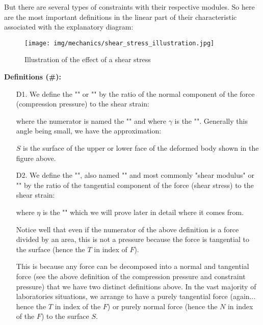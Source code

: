 	But there are several types of constraints with their respective modules. So here are the most important definitions in the linear part of their characteristic associated with the explanatory diagram:
	\begin{figure}[H]
		\centering
		\texttt{[image: img/mechanics/shear\_stress\_illustration.jpg]}
		\caption{Illustration of the effect of a shear stress}
	\end{figure}
	\textbf{Definitions (\#\mydef):}
	\begin{enumerate}
		\item[D1.] We define the "" or "" by the ratio of the normal component of the force (compression pressure) to the shear strain:
		
		where the numerator is named the "" and where $\gamma$ is the "". Generally this angle being small, we have the approximation:
		
		$S$ is the surface of the upper or lower face of the deformed body shown in the figure above.
		
		\item[D2.] We define the "", also named "" and most commonly "\index{}shear modulus" or "" by the ratio of the tangential component of the force (shear stress) to the shear strain:
		
		where $\eta$ is the "" which we will prove later in detail where it comes from.
		
		Notice well that even if the numerator of the above definition is a force divided by an area, this is not a pressure because the force is tangential to the surface (hence the $T$ in index of $F$).
		
		This is because any force can be decomposed into a normal and tangential force (see the above definition of the compression pressure and constraint pressure) that we have two distinct definitions above. In the vast majority of laboratories situations, we arrange to have a purely tangential force (again... hence the $T$ in index of the $F$) or purely normal force (hence the $N$ in index of the $F$) to the surface $S$.
		

\end{enumerate}

